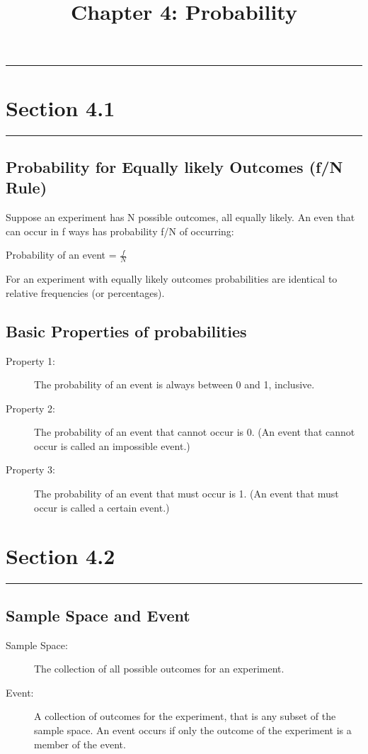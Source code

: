 \documentclass[12pt]{article}
\title{Chapter 4: Probability}
\author{}
\begin{document}
    \maketitle

    \noindent\rule{\textwidth}{0.4pt}
    \section*{Section 4.1}
    \noindent\rule{\textwidth}{0.4pt}
        \subsection*{Probability for Equally likely Outcomes (f/N Rule)}
            Suppose an experiment has N possible outcomes, all equally likely. An even that can
            occur in f ways has probability f/N of occurring:
            \begin{center}
                Probability of an event = $\frac{f}{N}$     
            \end{center}
            For an experiment with equally likely outcomes probabilities are identical to relative 
            frequencies (or percentages).
        \subsection*{Basic Properties of probabilities}
            \begin{description}
                \item[Property 1:] The probability of an event is always between 0 and 1, inclusive.
                \item[Property 2:] The probability of an event that cannot occur is 0. (An event 
                that cannot occur is called an impossible event.)
                \item[Property 3:] The probability of an event that must occur is 1. (An event that 
                must occur is called a certain event.)
            \end{description}

    \section*{Section 4.2}
    \noindent\rule{\textwidth}{0.4pt}
        \subsection*{Sample Space and Event}
            \begin{description}
                \item[Sample Space:] The collection of all possible outcomes for an experiment.
                \item[Event:] A collection of outcomes for the experiment, that is any subset of the
                sample space. An event occurs if only the outcome of the experiment is a member of
                the event.
            \end{description}
\end{document}
